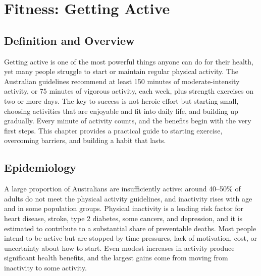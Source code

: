 \chapter{Fitness: Getting Active}

\section*{Definition and Overview}
Getting active is one of the most powerful things anyone can do for their health, yet many people struggle to start or maintain regular physical activity. The Australian guidelines recommend at least 150 minutes of moderate-intensity activity, or 75 minutes of vigorous activity, each week, plus strength exercises on two or more days. The key to success is not heroic effort but starting small, choosing activities that are enjoyable and fit into daily life, and building up gradually. Every minute of activity counts, and the benefits begin with the very first steps. This chapter provides a practical guide to starting exercise, overcoming barriers, and building a habit that lasts.

\section*{Epidemiology}
A large proportion of Australians are insufficiently active: around 40--50\% of adults do not meet the physical activity guidelines, and inactivity rises with age and in some population groups. Physical inactivity is a leading risk factor for heart disease, stroke, type 2 diabetes, some cancers, and depression, and it is estimated to contribute to a substantial share of preventable deaths. Most people intend to be active but are stopped by time pressures, lack of motivation, cost, or uncertainty about how to start. Even modest increases in activity produce significant health benefits, and the largest gains come from moving from inactivity to some activity.

